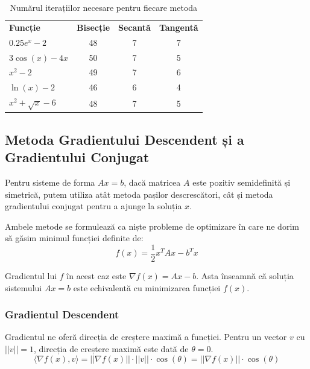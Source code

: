 \documentclass{exam}
\begin{document}
\newpage
\begin{table}
	\centering
	\label{tab:root_finding}
	\begin{tabular}{lccc}
		\textbf{Funcție}     & \textbf{Bisecție} & \textbf{Secantă} & \textbf{Tangentă} \\
		$0.25e^x - 2$        & 48                & 7                & 7                 \\
		$3\cos(x) - 4x$      & 50                & 7                & 5                 \\
		$x^2 - 2$            & 49                & 7                & 6                 \\
		$\ln(x) - 2$         & 46                & 6                & 4                 \\
		$ x^2 + \sqrt{x}- 6$ & 48                & 7                & 5                 \\
	\end{tabular}
	\caption{Numărul iterațiilor necesare pentru fiecare metoda}
\end{table}

\subsection{Metoda Gradientului Descendent și a Gradientului Conjugat}

Pentru sisteme de forma $Ax=b$, dacă matricea $A$ este pozitiv semidefinită și
simetrică, putem utiliza atât metoda pașilor descrescători, cât și metoda
gradientului conjugat pentru a ajunge la soluția $x$.

Ambele metode se formulează ca niște probleme de optimizare în care ne dorim
să găsim minimul funcției definite de:
\begin{equation*}
	f(x) = \frac{1}{2} x^T A x - b^T x
\end{equation*}

Gradientul lui $f$ în acest caz este $\nabla f(x) = Ax - b$. Asta înseamnă că
soluția sistemului $Ax = b$ este echivalentă cu minimizarea funcției $f(x)$.

\subsubsection{Gradientul Descendent}

Gradientul ne oferă direcția de creștere maximă a funcției. Pentru un vector $v$
cu $||v|| = 1$, direcția de creștere maximă este dată de $\theta = 0$.
\begin{equation*}
	\langle \nabla f(x), v \rangle = ||\nabla f(x)|| \cdot ||v|| \cdot \cos(\theta) = ||\nabla f(x)|| \cdot \cos(\theta)
\end{equation*}
\end{document}
